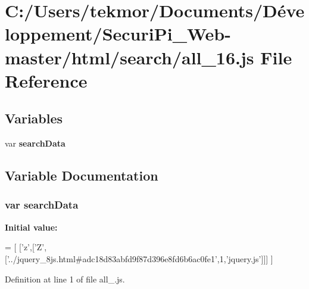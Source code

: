 \section{C\+:/\+Users/tekmor/\+Documents/\+Développement/\+Securi\+Pi\+\_\+\+Web-\/master/html/search/all\+\_\+16.js File Reference}
\label{all__16_8js}
\subsection*{Variables}
\begin{DoxyCompactItemize}
\item 
var {\bf search\+Data}
\end{DoxyCompactItemize}


\subsection{Variable Documentation}
\subsubsection[{search\+Data}]{\setlength{\rightskip}{0pt plus 5cm}var search\+Data}\label{all__16_8js_ad01a7523f103d6242ef9b0451861231e}
{\bfseries Initial value\+:}
\begin{DoxyCode}
=
[
  [\textcolor{charliteral}{'z'},[\textcolor{charliteral}{'Z'},[\textcolor{stringliteral}{'../jquery\_8js.html#adc18d83abfd9f87d396e8fd6b6ac0fe1'},1,\textcolor{stringliteral}{'jquery.js'}]]]
]
\end{DoxyCode}


Definition at line 1 of file all\+\_.\+js.

